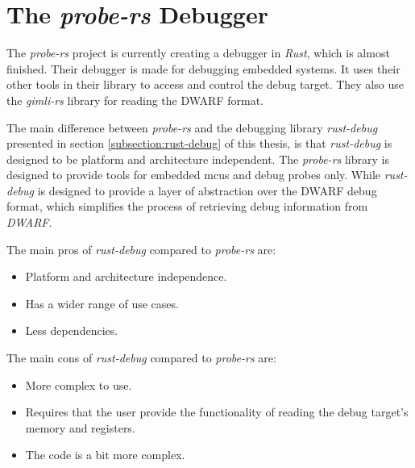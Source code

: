 

\section{The \emph{probe-rs} Debugger}

The \emph{probe-rs} project is currently creating a debugger in \emph{Rust}, which is almost finished.
Their debugger is made for debugging embedded systems.
It uses their other tools in their library to access and control the debug target.
They also use the \emph{gimli-rs} library for reading the \gls{DWARF} format.


The main difference between \emph{probe-rs} and the debugging library \emph{rust-debug} presented in section \ref{subsection:rust-debug} of this thesis, is that \emph{rust-debug} is designed to be platform and architecture independent.
The \emph{probe-rs} library is designed to provide tools for embedded \glspl{mcu} and debug probes only.
While \emph{rust-debug} is designed to provide a layer of abstraction over the \gls{DWARF} debug format, which simplifies the process of retrieving debug information from \emph{DWARF}.

The main pros of \emph{rust-debug} compared to \emph{probe-rs} are:
\begin{itemize}
  \item Platform and architecture independence.
  \item Has a wider range of use cases.
  \item Less dependencies.
\end{itemize}

The main cons of \emph{rust-debug} compared to \emph{probe-rs} are:
\begin{itemize}
  \item More complex to use.
  \item Requires that the user provide the functionality of reading the debug target's memory and registers.
  \item The code is a bit more complex.
\end{itemize}



